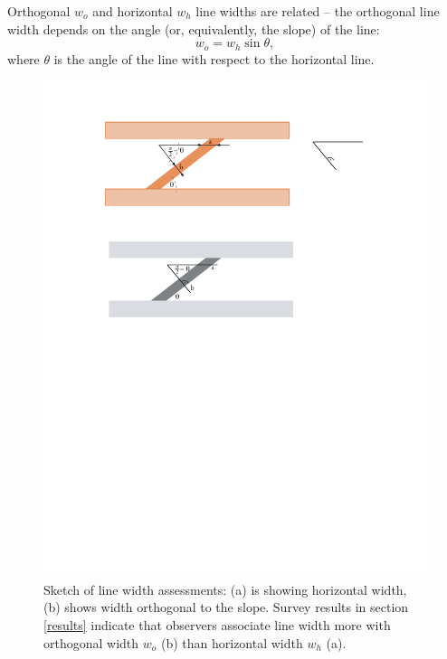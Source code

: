 \documentclass[journal]{vgtc}\usepackage{graphicx, color}
\begin{document}
Orthogonal $w_o$ and horizontal $w_h$ line widths are related -- the orthogonal line width depends on the angle (or, equivalently, the slope) of the line:
\begin{equation}\label{adjust}
w_o = w_h \sin \theta,
\end{equation}
where $\theta$ is the angle of the line with respect to the horizontal line.

\begin{figure}[htbp]
\begin{center}
\includegraphics[width=0.6\linewidth]{images/linewidth}
\end{center}
\caption{\label{fig:linewidth}Sketch of line width assessments: (a) is showing  horizontal width, (b) shows  width orthogonal to the slope. Survey results in section \ref{results}  indicate that observers associate line width more with  orthogonal width $w_o$ (b) than horizontal width $w_h$ (a).}
\end{figure}



\end{document}
